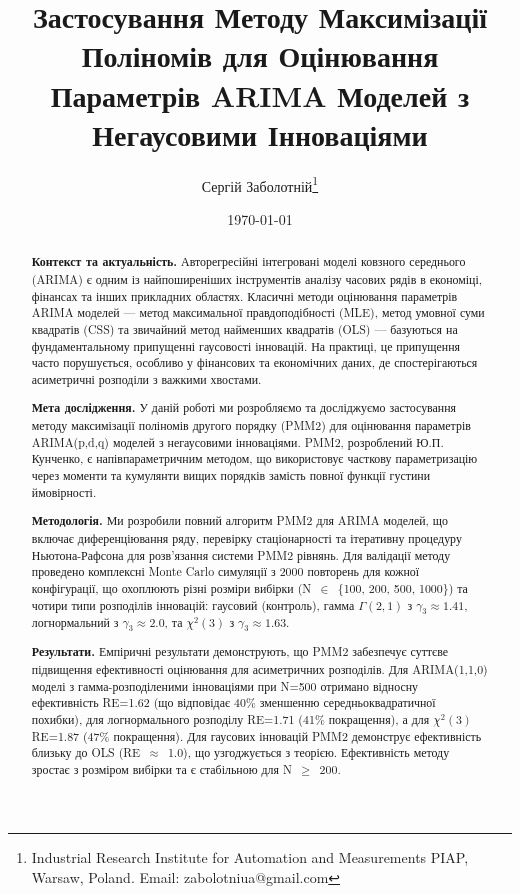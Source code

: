 \documentclass[12pt,a4paper]{article}
\title{Застосування Методу Максимізації Поліномів для Оцінювання Параметрів ARIMA Моделей з Негаусовими Інноваціями}
\author{Сергій Заболотній\thanks{Industrial Research Institute for Automation and Measurements PIAP, Warsaw, Poland. Email: zabolotniua@gmail.com}}
\date{\today}
\begin{document}
\maketitle

\begin{abstract}

\textbf{Контекст та актуальність.} Авторегресійні інтегровані моделі ковзного середнього (ARIMA) є одним із найпоширеніших інструментів аналізу часових рядів в економіці, фінансах та інших прикладних областях. Класичні методи оцінювання параметрів ARIMA моделей --- метод максимальної правдоподібності (MLE), метод умовної суми квадратів (CSS) та звичайний метод найменших квадратів (OLS) --- базуються на фундаментальному припущенні гаусовості інновацій. На практиці, це припущення часто порушується, особливо у фінансових та економічних даних, де спостерігаються асиметричні розподіли з важкими хвостами.

\textbf{Мета дослідження.} У даній роботі ми розробляємо та досліджуємо застосування методу максимізації поліномів другого порядку (PMM2) для оцінювання параметрів ARIMA(p,d,q) моделей з негаусовими інноваціями. PMM2, розроблений Ю.П. Кунченко, є напівпараметричним методом, що використовує часткову параметризацію через моменти та кумулянти вищих порядків замість повної функції густини ймовірності.

\textbf{Методологія.} Ми розробили повний алгоритм PMM2 для ARIMA моделей, що включає диференціювання ряду, перевірку стаціонарності та ітеративну процедуру Ньютона-Рафсона для розв'язання системи PMM2 рівнянь. Для валідації методу проведено комплексні Monte Carlo симуляції з 2000 повторень для кожної конфігурації, що охоплюють різні розміри вибірки (N~$\in$~\{100, 200, 500, 1000\}) та чотири типи розподілів інновацій: гаусовий (контроль), гамма $\Gamma(2,1)$ з $\gamma_3 \approx 1.41$, логнормальний з $\gamma_3 \approx 2.0$, та $\chi^2(3)$ з $\gamma_3 \approx 1.63$.

\textbf{Результати.} Емпіричні результати демонструють, що PMM2 забезпечує суттєве підвищення ефективності оцінювання для асиметричних розподілів. Для ARIMA(1,1,0) моделі з гамма-розподіленими інноваціями при N=500 отримано відносну ефективність RE=1.62 (що відповідає 40\% зменшенню середньоквадратичної похибки), для логнормального розподілу RE=1.71 (41\% покращення), а для $\chi^2(3)$ RE=1.87 (47\% покращення). Для гаусових інновацій PMM2 демонструє ефективність близьку до OLS (RE~$\approx$~1.0), що узгоджується з теорією. Ефективність методу зростає з розміром вибірки та є стабільною для N~$\geq$~200.


\end{abstract}
\end{document}
